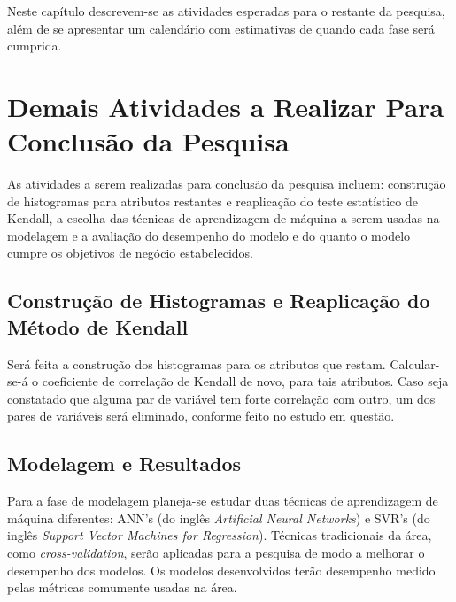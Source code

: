Neste capítulo descrevem-se as atividades esperadas para o restante da pesquisa, além de
se apresentar um calendário com estimativas de quando cada fase será cumprida. 

\section{Demais Atividades a Realizar Para Conclusão da Pesquisa}
As atividades a serem realizadas para conclusão da pesquisa incluem: construção de
histogramas para atributos restantes e reaplicação do teste estatístico de Kendall, a
escolha das técnicas de aprendizagem de máquina a serem usadas na modelagem e a
avaliação do desempenho do modelo e do quanto o modelo cumpre os objetivos de negócio
estabelecidos. 

\subsection{Construção de Histogramas e Reaplicação do Método de Kendall}
Será feita a construção dos histogramas para os atributos que restam. Calcular-se-á o
coeficiente de correlação de Kendall de novo, para tais atributos. Caso seja
constatado que alguma par de variável tem forte correlação com outro, um dos pares de
variáveis será eliminado, conforme feito no estudo em questão. 

\subsection{Modelagem e Resultados}
Para a fase de modelagem planeja-se estudar duas técnicas de aprendizagem de máquina
diferentes: ANN's (do inglês \textit{Artificial Neural Networks}) e 
SVR's (do inglês \textit{Support Vector Machines for Regression}). Técnicas
tradicionais da área, como \textit{cross-validation}, serão aplicadas para a
pesquisa de modo a melhorar o desempenho dos modelos. 
Os modelos desenvolvidos terão desempenho medido pelas métricas 
comumente usadas na área. 


